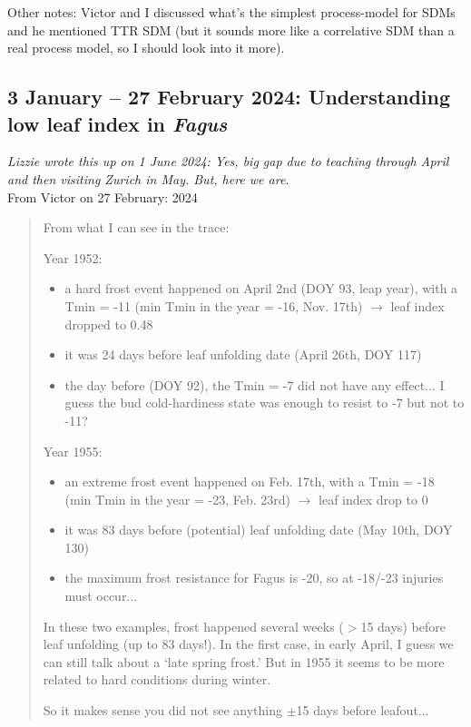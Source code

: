 \documentclass[11pt,letter]{article}
\begin{document}
Other notes: Victor and I discussed what's the simplest process-model for SDMs and he mentioned TTR SDM (but it sounds more like a correlative SDM than a real process model, so I should look into it more).


\subsection{3 January -- 27 February 2024: Understanding low leaf index in \emph{Fagus}}
\emph{Lizzie wrote this up on 1 June 2024: Yes, big gap due to teaching through April and then visiting Zurich in May. But, here we are.}\\


From Victor on 27 February: 2024
\begin{quote}
From what I can see in the trace:

Year 1952:
\begin{itemize}
\item a hard frost event happened on April 2nd (DOY 93, leap year), with a Tmin = -11 (min Tmin in the year = -16, Nov. 17th) $\rightarrow$ leaf index dropped to 0.48
\item it was 24 days before leaf unfolding date (April 26th, DOY 117)
\item the day before (DOY 92), the Tmin = -7 did not have any effect... I guess the bud cold-hardiness state was enough to resist to -7 but not to -11?
\end{itemize}

Year 1955:
\begin{itemize}
\item an extreme frost event happened on Feb. 17th, with a Tmin = -18 (min Tmin in the year = -23, Feb. 23rd) $\rightarrow$ leaf index drop to 0
\item it was 83 days before (potential) leaf unfolding date (May 10th, DOY 130)
\item the maximum frost resistance for Fagus is -20, so at -18/-23 injuries must occur... 
\end{itemize}

In these two examples, frost happened several weeks ($>$15 days) before leaf unfolding (up to 83 days!).
In the first case, in early April, I guess we can still talk about a `late spring frost.' 
But in 1955 it seems to be more related to hard conditions during winter. 

So it makes sense you did not see anything $\pm$15 days before leafout...
\end{quote}
\end{document}
